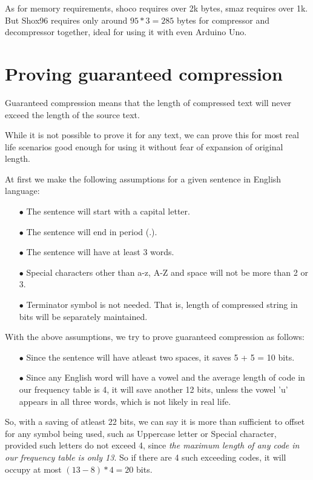 \documentclass[]{article}
\begin{document}
As for memory requirements, shoco requires over 2k bytes, smaz requires over 1k. But Shox96 requires only around $95 * 3 = 285$ bytes for compressor and decompressor together, ideal for using it with even Arduino Uno.

\section{Proving guaranteed compression}

Guaranteed compression means that the length of compressed text will never exceed the length of the source text.

While it is not possible to prove it for any text, we can prove this for most real life scenarios good enough for using it without fear of expansion of original length.

At first we make the following assumptions for a given sentence in English language:
\begin{itemize}
	\item[$\bullet$] The sentence will start with a capital letter.
	\item[$\bullet$] The sentence will end in period (.).
	\item[$\bullet$] The sentence will have at least 3 words.
	\item[$\bullet$] Special characters other than a-z, A-Z and space will not be more than 2 or 3.
	\item[$\bullet$] Terminator symbol is not needed. That is, length of compressed string in bits will be separately maintained.
\end{itemize}

With the above assumptions, we try to prove guaranteed compression as follows:

\begin{itemize}
	\item[$\bullet$] Since the sentence will have atleast two spaces, it saves 5 + 5 = 10 bits.
	\item[$\bullet$] Since any English word will have a vowel and the average length of code in our frequency table is 4, it will save another 12 bits, unless the vowel 'u' appears in all three words, which is not likely in real life.
\end{itemize}

So, with a saving of atleast 22 bits, we can say it is more than sufficient to offset for any symbol being used, such as Uppercase letter or Special character, provided such letters do not exceed 4, since \emph{the maximum length of any code in our frequency table is only 13}.  So if there are 4 such exceeding codes, it will occupy at most $(13 - 8) * 4 = 20$ bits.
\end{document}
